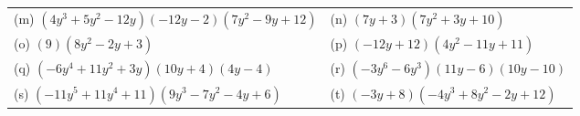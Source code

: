 \begin{enumerate}[noitemsep, label=\textbf{\arabic*}. ]
{{\begin{center}
\begin{xtabular}[t]{|l|l|}
        (m) $\left(4{y}^{3}+5{y}^{2}-12y\right)\left(-12y-2\right)\left(7{y}^{2}-9y+12\right)$ &
        (n) $\left(7y+3\right)\left(7{y}^{2}+3y+10\right)$%
     \tabularnewline{}
        (o) $\left(9\right)\left(8{y}^{2}-2y+3\right)$ &
        (p) $\left(-12y+12\right)\left(4{y}^{2}-11y+11\right)$%
     \tabularnewline{}
        (q) $\left(-6{y}^{4}+11{y}^{2}+3y\right)\left(10y+4\right)\left(4y-4\right)$ &
        (r) $\left(-3{y}^{6}-6{y}^{3}\right)\left(11y-6\right)\left(10y-10\right)$%
     \tabularnewline{}
        (s) $\left(-11{y}^{5}+11{y}^{4}+11\right)\left(9{y}^{3}-7{y}^{2}-4y+6\right)$ &
        (t) $\left(-3y+8\right)\left(-4{y}^{3}+8{y}^{2}-2y+12\right)$%
     \tabularnewline{}

\end{xtabular}
\end{center}}}
\end{enumerate}
